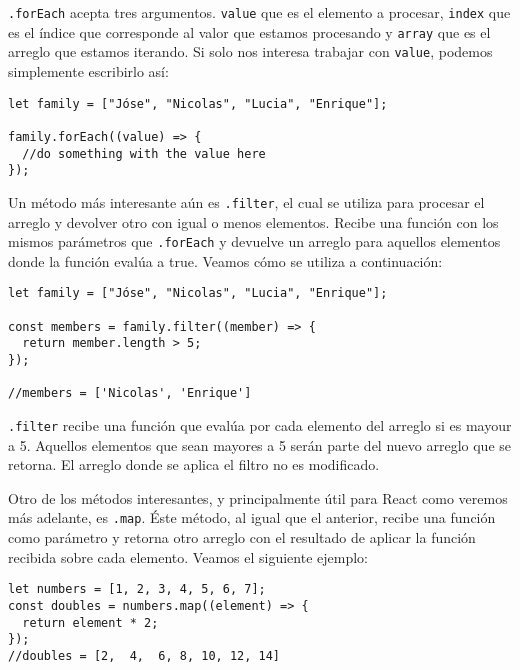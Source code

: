 \documentclass[a4paper, oneside, titlepage, 12pt]{paper}
\begin{document}
\texttt{.forEach} acepta tres argumentos. \texttt{value} que es el elemento a procesar, \texttt{index} que es el índice que corresponde al valor que estamos procesando y \texttt{array} que es el arreglo que estamos iterando. Si solo nos interesa trabajar con \texttt{value}, podemos simplemente escribirlo así:

\begin{verbatim}
let family = ["Jóse", "Nicolas", "Lucia", "Enrique"];

family.forEach((value) => {
  //do something with the value here	
});
\end{verbatim}

Un método más interesante aún es \texttt{.filter}, el cual se utiliza para procesar el arreglo y devolver otro con igual o menos elementos. Recibe una función con los mismos parámetros que \texttt{.forEach} y devuelve un arreglo para aquellos elementos donde la función evalúa a true. Veamos cómo se utiliza a continuación:

\begin{verbatim}
let family = ["Jóse", "Nicolas", "Lucia", "Enrique"];

const members = family.filter((member) => {
  return member.length > 5;
});

//members = ['Nicolas', 'Enrique']
\end{verbatim}

\texttt{.filter} recibe una función que evalúa por cada elemento del arreglo si es mayour a 5. Aquellos elementos que sean mayores a 5 serán parte del nuevo arreglo que se retorna. El arreglo donde se aplica el filtro no es modificado.

Otro de los métodos interesantes, y principalmente útil para React como veremos más adelante, es \texttt{.map}. Éste método, al igual que el anterior, recibe una función como parámetro y retorna otro arreglo con el resultado de aplicar la función recibida sobre cada elemento. Veamos el siguiente ejemplo:

\begin{verbatim}
let numbers = [1, 2, 3, 4, 5, 6, 7];
const doubles = numbers.map((element) => {
  return element * 2;
});
//doubles = [2,  4,  6, 8, 10, 12, 14]
\end{verbatim}
\end{document}
